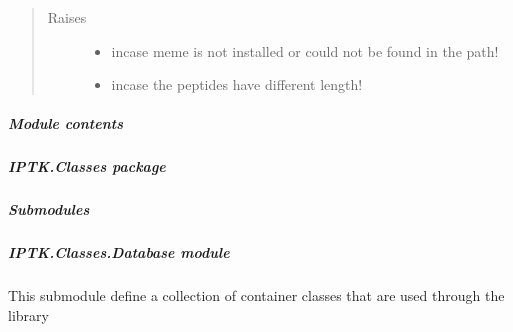 \documentclass[letterpaper,10pt,english]{sphinxmanual}
\begin{document}
\begin{fulllineitems}
\begin{quote}
\begin{description}
\begin{itemize}
\end{itemize}

\item[{Raises}] \leavevmode\begin{itemize}
\item {} 
 \textendash{} incase meme is not installed or could not be found in the path!

\item {} 
 \textendash{} incase the peptides have different length!

\end{itemize}

\end{description}\end{quote}

\end{fulllineitems}



\subparagraph{Module contents}
\label{\detokenize{IPTK.Analysis:module-IPTK.Analysis}}\label{\detokenize{IPTK.Analysis:module-contents}}

\subparagraph{IPTK.Classes package}
\label{\detokenize{IPTK.Classes:iptk-classes-package}}\label{\detokenize{IPTK.Classes::doc}}

\subparagraph{Submodules}
\label{\detokenize{IPTK.Classes:submodules}}

\subparagraph{IPTK.Classes.Database module}
\label{\detokenize{IPTK.Classes:module-IPTK.Classes.Database}}\label{\detokenize{IPTK.Classes:iptk-classes-database-module}}
This submodule define a collection of container classes that are used through the library
\end{document}
